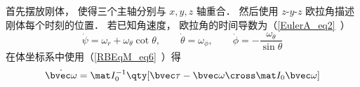 

首先摆放刚体， 使得三个主轴分别与 $x,y,z$ 轴重合． 然后使用 $z$-$y$-$z$ 欧拉角描述刚体每个时刻的位置． 若已知角速度， 欧拉角的时间导数为（\autoref{EulerA_eq2}~）
\begin{equation}
\dot\psi = \omega_r + \omega_\theta \cot\theta,\qquad
\dot\theta = \omega_\phi,\qquad
\dot\phi = -\frac{\omega_\theta}{\sin\theta}
\end{equation}
在体坐标系中使用（\autoref{RBEqM_eq6}~）得
\begin{equation}
\dot{\bvec \omega} = \mat I_0^{-1} \qty[\bvec \tau  - \bvec\omega\cross \mat I_0 \bvec\omega]
\end{equation}

